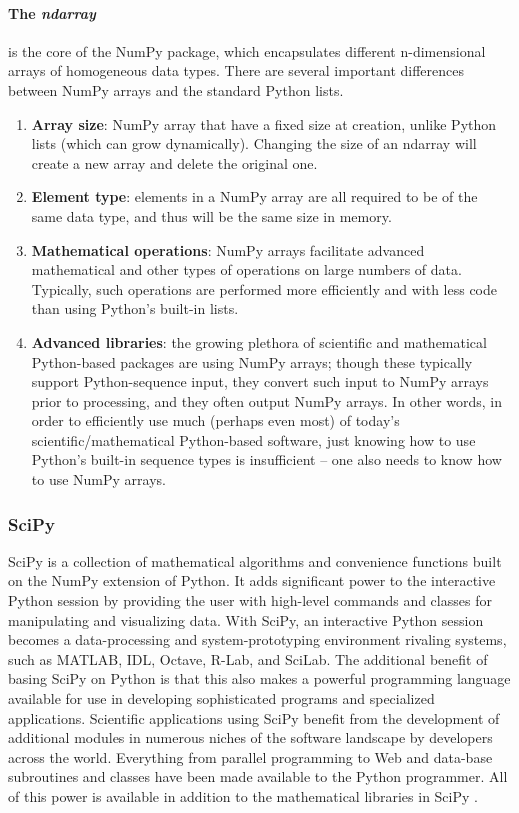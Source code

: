 \documentclass[\main/main.tex]{subfiles}
\begin{document}
\paragraph{The \emph{ndarray}} is the core of the NumPy package, which encapsulates different n-dimensional arrays of homogeneous data types. There are several important differences between NumPy arrays and the standard Python lists.
\begin{enumerate}
    \item \textbf{Array size}: NumPy array that have a fixed size at creation, unlike Python lists (which can grow dynamically). Changing the size of an ndarray will create a new array and delete the original one.
    \item \textbf{Element type}: elements in a NumPy array are all required to be of the same data type, and thus will be the same size in memory.
    \item \textbf{Mathematical operations}: NumPy arrays facilitate advanced mathematical and other types of operations on large numbers of data. Typically, such operations are performed more efficiently and with less code than using Python’s built-in lists.
    \item \textbf{Advanced libraries}: the growing plethora of scientific and mathematical Python-based packages are using NumPy arrays; though these typically support Python-sequence input, they convert such input to NumPy arrays prior to processing, and they often output NumPy arrays. In other words, in order to efficiently use much (perhaps even most) of today’s scientific/mathematical Python-based software, just knowing how to use Python’s built-in sequence types is insufficient -- one also needs to know how to use NumPy arrays.
\end{enumerate}
\subsubsection{SciPy}
SciPy is a collection of mathematical algorithms and convenience functions built on the NumPy extension of Python. It adds significant power to the interactive Python session by providing the user with high-level commands and classes for manipulating and visualizing data. With SciPy, an interactive Python session becomes a data-processing and system-prototyping environment rivaling systems, such as MATLAB, IDL, Octave, R-Lab, and SciLab.
The additional benefit of basing SciPy on Python is that this also makes a powerful programming language available for use in developing sophisticated programs and specialized applications. Scientific applications using SciPy benefit from the development of additional modules in numerous niches of the software landscape by developers across the world. Everything from parallel programming to Web and data-base subroutines and classes have been made available to the Python programmer. All of this power is available in addition to the mathematical libraries in SciPy \cite{2020SciPyNMeth}.
\end{document}
